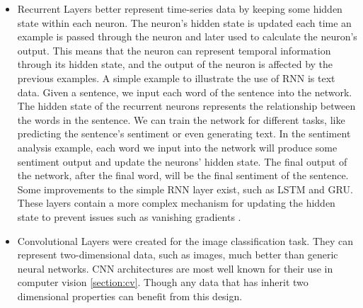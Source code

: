 \documentclass[../main.tex]{subfiles}
\begin{document}
\begin{itemize}
    \item Recurrent Layers better represent time-series data by keeping some hidden state within each neuron. The neuron's hidden state is updated
        each time an example is passed through the neuron and later used to calculate the neuron's output.
        This means that the neuron can represent temporal information through its hidden state,
        and the output of the neuron is affected by the previous examples.
        A simple example to illustrate the use of RNN is text data. Given a sentence, we input each word of the sentence into the network.
        The hidden state of the recurrent neurons represents the relationship between the words in the sentence. We can train the network for
        different tasks, like predicting the sentence's sentiment or even generating text. In the sentiment analysis example,
        each word we input into the network will produce some sentiment output and update the neurons' hidden state. The final output of the network,
        after the final word, will be the final sentiment of the sentence. Some improvements to the simple RNN layer exist,
        such as LSTM \cite{lstm} and GRU\cite{GRU}. These layers contain a more complex mechanism for
        updating the hidden state to prevent issues such as 
        vanishing gradients \cite{vanishing-gradients}. 
    \item Convolutional Layers were created for the image classification task. They can represent two-dimensional data, such as images,
        much better than generic neural networks. CNN architectures are most well known for their use in computer vision \ref{section:cv}.
        Though any data that has inherit two dimensional properties can benefit from this design. 
\end{itemize}
\end{document}
